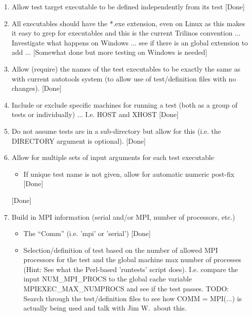 \documentclass[pdf,ps2pdf,11pt]{SANDreport}
\begin{document}
\begin{enumerate}
  \begin{enumerate}

  {}\item Allow test target executable to be defined independently
  from its test [Done]

  {}\item All executables should have the *.exe extension, even on
  Linux as this makes it easy to grep for executables and this is the
  current Trilinos convention ... Investigate what happens on Windows
  ... see if there is an global extension to add ... [Somewhat done
  but more testing on Windows is needed]

  {}\item Allow (require) the names of the test executables to be
  exactly the same as with current autotools system (to allow use of
  test/definition files with no changes). [Done]

  {}\item Include or exclude specific machines for running a test
  (both as a group of tests or individually) ... I.e. HOST and XHOST
  [Done]

  {}\item Do not assume tests are in a sub-directory but allow for this
  (i.e. the DIRECTORY argument is optional). [Done]

  {}\item Allow for multiple sets of input arguments for each test
  executable

    \begin{itemize}

    {}\item If unique test name is not given, allow for automatic
    numeric post-fix [Done]

    \end{itemize}

   [Done]

  {}\item Build in MPI information (serial and/or MPI, number of
  processors, etc.)

    \begin{itemize}

    {}\item The ``Comm'' (i.e. 'mpi' or 'serial') [Done]

    {}\item Selection/definition of test based on the number of allowed
    MPI processors for the test and the global machine max number of
    processes (Hint: See what the Perl-based 'runtests' script does).
    I.e. compare the input NUM\_MPI\_PROCS to the global cache variable
    MPIEXEC\_MAX\_NUMPROCS and see if the test passes.  TODO: Search
    through the test/definition files to see how COMM = MPI(...) is
    actually being used and talk with Jim W.\ about this.
	

\end{itemize}
\end{enumerate}
\end{enumerate}
\end{document}
